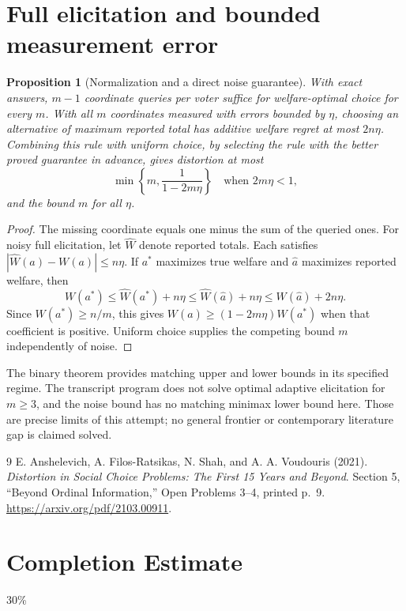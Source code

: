 \documentclass[11pt]{article}
\newtheorem{proposition}[theorem]{Proposition}
\theoremstyle{remark}
\begin{document}
\section{Full elicitation and bounded measurement error}
\begin{proposition}[Normalization and a direct noise guarantee]
With exact answers, $m-1$ coordinate queries per voter suffice for
welfare-optimal choice for every $m$. With all $m$ coordinates measured
with errors bounded by $\eta$, choosing an alternative of maximum
reported total has additive welfare regret at most $2n\eta$.
Combining this rule with uniform choice, by selecting the rule with the
better proved guarantee in advance, gives distortion at most
\[
 \min\left\{m,\frac{1}{1-2m\eta}\right\}
 \quad\text{when }2m\eta<1,
\]
and the bound $m$ for all $\eta$.
\end{proposition}
\begin{proof}
The missing coordinate equals one minus the sum of the queried ones.
For noisy full elicitation, let $\widehat W$ denote reported totals.
Each satisfies $|\widehat W(a)-W(a)|\leq n\eta$.
If $a^*$ maximizes true welfare and $\widehat a$ maximizes reported
welfare, then
\[
 W(a^*)\leq\widehat W(a^*)+n\eta
 \leq\widehat W(\widehat a)+n\eta
 \leq W(\widehat a)+2n\eta.
\]
Since $W(a^*)\geq n/m$, this gives
$W(\widehat a)\geq(1-2m\eta)W(a^*)$ when that coefficient is positive.
Uniform choice supplies the competing bound $m$ independently of noise.
\end{proof}

The binary theorem provides matching upper and lower bounds in its
specified regime. The transcript program does not solve optimal
adaptive elicitation for $m\geq3$, and the noise bound has no matching
minimax lower bound here. Those are precise limits of this attempt;
no general frontier or contemporary literature gap is claimed solved.
\begin{thebibliography}{9}
 E. Anshelevich, A. Filos-Ratsikas, N. Shah, and
A. A. Voudouris (2021). \emph{Distortion in Social Choice Problems:
The First 15 Years and Beyond}. Section 5, ``Beyond Ordinal Information,''
Open Problems 3--4, printed p.~9.
\url{https://arxiv.org/pdf/2103.00911}.
\end{thebibliography}

\section{Completion Estimate}
30\%
\end{document}

